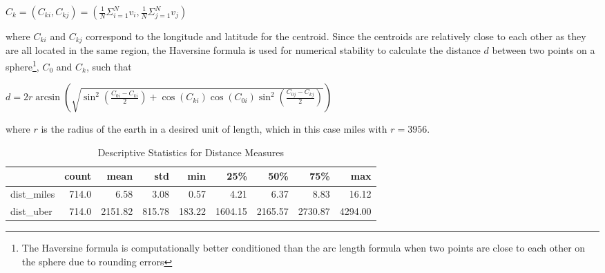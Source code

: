 \documentclass{article}
\begin{document}
\begin{center}
    $C_k = (C_{ki}, C_{kj})  = (\frac{1}{N} \Sigma_{i=1}^{N} v_i, \frac{1}{N} \Sigma_{j=1}^{N} v_j) $
\end{center}

where $C_{ki}$ and $C_{kj}$ correspond to the longitude and latitude for the centroid. Since the centroids are relatively close to each other as they are all located in the same region, the Haversine formula \citep{VanBrummelenGlen2017Hm:t} is used for numerical stability to calculate the distance $d$ between two points on a sphere\footnote{The Haversine formula is computationally better conditioned than the arc length formula when two points are close to each other on the sphere due to rounding errors}, $C_0$ and $C_k$, such that

\begin{center}
    $d =2 r \arcsin \left(\sqrt{\sin ^{2}\left(\frac{C_{0i}-C_{ki}}{2}\right)+\cos \left(C_{ki}\right) \cos \left(C_{0i}\right) \sin ^{2}\left(\frac{C_{0j}-C_{kj}}{2}\right)}\right)$
\end{center}

where $r$ is the radius of the earth in a desired unit of length, which in this case miles with $r = 3956$. 

\begin{table}[t]
\centering
\caption{Descriptive Statistics for Distance Measures} 
  \label{table:distance} 
\begin{tabular}{lrrrrrrrr}
\toprule
{} &  count &     mean &     std &     min &      25\% &      50\% &      75\% &      max \\
\midrule
dist\_miles     &  714.0 &     6.58 &    3.08 &    0.57 &     4.21 &     6.37 &     8.83 &    16.12 \\
dist\_uber &  714.0 &  2151.82 &  815.78 &  183.22 &  1604.15 &  2165.57 &  2730.87 &  4294.00 \\
\bottomrule
\end{tabular}
\end{table}
\end{document}
